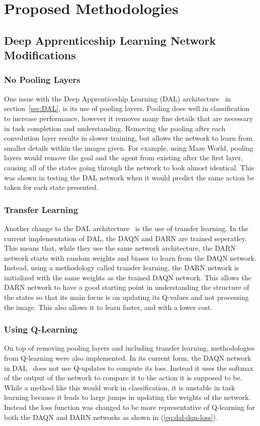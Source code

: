 \documentclass[12pt,american]{report}
\begin{document}
\chapter{Proposed Methodologies}
\label{sec:proposed_architectures}
\section{Deep Apprenticeship Learning Network Modifications}
\subsection{No Pooling Layers}
One issue with the Deep Apprenticeship Learning (DAL) architecture~\cite{markovikj2014deep} in section~\ref{sec:DAL}, is its use of pooling layers.  Pooling does well in classification to increase performance, however it removes many fine details that are necessary in task completion and understanding.  Removing the pooling after each convolution layer results in slower training, but allows the network to learn from smaller details within the images given.  For example, using Maze World, pooling layers would remove the goal and the agent from existing after the first layer, causing all of the states going through the network to look almost identical.  This was shown in testing the DAL network when it would predict the same action be taken for each state presented.
\subsection{Transfer Learning}
Another change to the DAL architecture~\cite{markovikj2014deep} is the use of transfer learning.  In the current implementation of DAL, the DAQN and DARN are trained seperatley.  This means that, while they use the same network architecture, the DARN network starts with random weights and biases to learn from the DAQN network.  Instead, using a methodology called transfer learning, the DARN network is initialized with the same weights as the trained DAQN network.  This allows the DARN network to have a good starting point in understanding the structure of the states so that its main focus is on updating its Q-values and not processing the image.  This also allows it to learn faster, and with a lower cost.
\subsection{Using Q-Learning}
On top of removing pooling layers and including transfer learning, methodologies from Q-learning were also implemented.  In its current form, the DAQN network in DAL~\cite{markovikj2014deep} does not use Q-updates to compute its loss.  Instead it uses the softmax of the output of the network to compare it to the action it is supposed to be.  While a method like this would work in classification, it is unstable in task learning because it leads to large jumps in updating the weights of the network.  Instead the loss function was changed to be more representative of Q-learning for both the DAQN and DARN networks as shown in (\ref{eq:dal-dqn-loss}).
\end{document}
